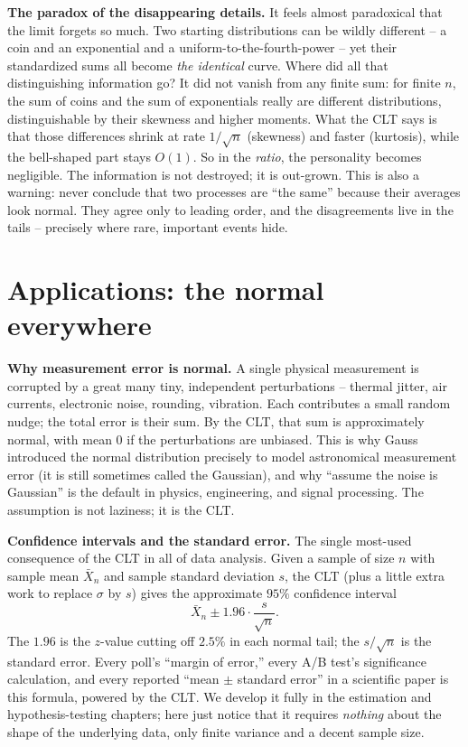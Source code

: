 \begin{paradoxbox}
\textbf{The paradox of the disappearing details.} It feels almost paradoxical that the
limit forgets so much. Two starting distributions can be wildly different -- a coin and
an exponential and a uniform-to-the-fourth-power -- yet their standardized sums all
become \emph{the identical} curve. Where did all that distinguishing information go? It
did not vanish from any finite sum: for finite $n$, the sum of coins and the sum of
exponentials really are different distributions, distinguishable by their skewness and
higher moments. What the CLT says is that those differences shrink at rate $1/\sqrt n$
(skewness) and faster (kurtosis), while the bell-shaped part stays $O(1)$. So in the
\emph{ratio}, the personality becomes negligible. The information is not destroyed; it is
out-grown. This is also a warning: never conclude that two processes are ``the same''
because their averages look normal. They agree only to leading order, and the
disagreements live in the tails -- precisely where rare, important events hide.
\end{paradoxbox}

\section{Applications: the normal everywhere}
\label{ch21:applications}

\begin{applicationbox}
\textbf{Why measurement error is normal.} A single physical measurement is corrupted by
a great many tiny, independent perturbations -- thermal jitter, air currents, electronic
noise, rounding, vibration. Each contributes a small random nudge; the total error is
their sum. By the CLT, that sum is approximately normal, with mean $0$ if the
perturbations are unbiased. This is why Gauss introduced the normal distribution
precisely to model astronomical measurement error (it is still sometimes called the
Gaussian), and why ``assume the noise is Gaussian'' is the default in physics,
engineering, and signal processing. The assumption is not laziness; it is the CLT.
\end{applicationbox}

\begin{applicationbox}
\textbf{Confidence intervals and the standard error.} The single most-used consequence
of the CLT in all of data analysis. Given a sample of size $n$ with sample mean
$\bar X_n$ and sample standard deviation $s$, the CLT (plus a little extra work to
replace $\sigma$ by $s$) gives the approximate $95\%$ confidence interval
\[
  \bar X_n \pm 1.96 \cdot \frac{s}{\sqrt n}.
\]
The $1.96$ is the $z$-value cutting off $2.5\%$ in each normal tail; the $s/\sqrt n$ is
the standard error. Every poll's ``margin of error,'' every A/B test's significance
calculation, and every reported ``mean $\pm$ standard error'' in a scientific paper is
this formula, powered by the CLT. We develop it fully in the estimation and
hypothesis-testing chapters; here just notice that it requires \emph{nothing} about the
shape of the underlying data, only finite variance and a decent sample size.
\end{applicationbox}

